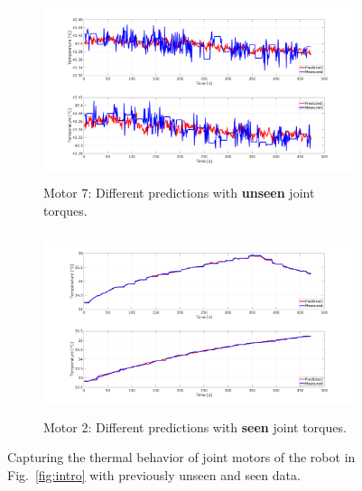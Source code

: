 \documentclass{ifacconf}
\begin{document}
\begin{figure}[t!]
	\begin{subfigure}[t]{0.5\textwidth}
		\centering
		\includegraphics[height=2.1in, width=\linewidth, keepaspectratio]{./pictures/applications/feedback/table/j7.png}
		\caption{Motor 7: Different predictions with \textbf{unseen} joint torques.}
	\end{subfigure}%
	\begin{subfigure}[t]{0.5\textwidth}
		\centering
		\includegraphics[height=2.1in, width=\linewidth, keepaspectratio]{./pictures/applications/feedback/table/j2_seen.png}
		\caption{Motor 2: Different predictions with \textbf{seen} joint torques.}
	\end{subfigure}

	\caption{Capturing the thermal behavior of joint motors of the robot in Fig.~\ref{fig:intro} with previously unseen and seen data.}
	\label{sevenjoint} 
\end{figure}
\end{document}

